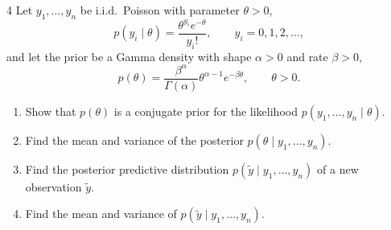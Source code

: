 \begin{homework}{4}
Let $y_1, \dots, y_n$ be i.i.d.\ Poisson with parameter $\theta > 0$,
\[
p(y_i \mid \theta) = \frac{\theta^{y_i}e^{-\theta}}{y_i!}, \qquad y_i = 0, 1, 2, \dots,
\]
and let the prior be a Gamma density with shape $\alpha > 0$ and rate $\beta > 0$,
\[
p(\theta) = \frac{\beta^{\alpha}}{\Gamma(\alpha)}\theta^{\alpha-1}e^{-\beta\theta}, \qquad \theta > 0.
\]
\begin{enumerate}[label=(\roman*)]
\item Show that $p(\theta)$ is a conjugate prior for the likelihood $p(y_1, \dots, y_n \mid \theta)$.
\item Find the mean and variance of the posterior $p(\theta \mid y_1, \dots, y_n)$.
\item Find the posterior predictive distribution $p(\tilde y \mid y_1, \dots, y_n)$ of a new observation $\tilde y$.
\item Find the mean and variance of $p(\tilde y \mid y_1, \dots, y_n)$.
\end{enumerate}


\end{homework}
